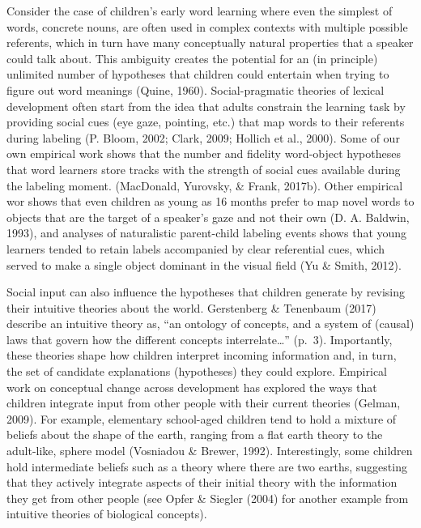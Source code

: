 \documentclass[oneside]{report}
\begin{document}
Consider the case of children's early word learning where even the
simplest of words, concrete nouns, are often used in complex contexts
with multiple possible referents, which in turn have many conceptually
natural properties that a speaker could talk about. This ambiguity
creates the potential for an (in principle) unlimited number of
hypotheses that children could entertain when trying to figure out word
meanings (Quine, 1960). Social-pragmatic theories of lexical development
often start from the idea that adults constrain the learning task by
providing social cues (eye gaze, pointing, etc.) that map words to their
referents during labeling (P. Bloom, 2002; Clark, 2009; Hollich et al.,
2000). Some of our own empirical work shows that the number and fidelity
word-object hypotheses that word learners store tracks with the strength
of social cues available during the labeling moment. (MacDonald,
Yurovsky, \& Frank, 2017b). Other empirical wor shows that even children
as young as 16 months prefer to map novel words to objects that are the
target of a speaker's gaze and not their own (D. A. Baldwin, 1993), and
analyses of naturalistic parent-child labeling events shows that young
learners tended to retain labels accompanied by clear referential cues,
which served to make a single object dominant in the visual field (Yu \&
Smith, 2012).

Social input can also influence the hypotheses that children generate by
revising their intuitive theories about the world. Gerstenberg \&
Tenenbaum (2017) describe an intuitive theory as, ``an ontology of
concepts, and a system of (causal) laws that govern how the different
concepts interrelate\ldots{}'' (p.~3). Importantly, these theories shape
how children interpret incoming information and, in turn, the set of
candidate explanations (hypotheses) they could explore. Empirical work
on conceptual change across development has explored the ways that
children integrate input from other people with their current theories
(Gelman, 2009). For example, elementary school-aged children tend to
hold a mixture of beliefs about the shape of the earth, ranging from a
flat earth theory to the adult-like, sphere model (Vosniadou \& Brewer,
1992). Interestingly, some children hold intermediate beliefs such as a
theory where there are two earths, suggesting that they actively
integrate aspects of their initial theory with the information they get
from other people (see Opfer \& Siegler (2004) for another example from
intuitive theories of biological concepts).
\end{document}
